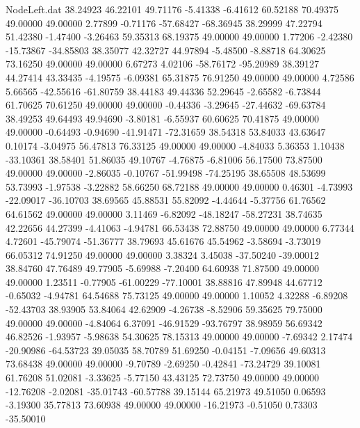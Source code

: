 \begin{filecontents}{NodeLeft.dat}
  38.24923   46.22101   49.71176    -5.41338   -6.41612   60.52188   70.49375   49.00000   49.00000    2.77899   -0.71176  -57.68427  -68.36945
  38.29999   47.22794   51.42380    -1.47400   -3.26463   59.35313   68.19375   49.00000   49.00000    1.77206   -2.42380  -15.73867  -34.85803
  38.35077   42.32727   44.97894    -5.48500   -8.88718   64.30625   73.16250   49.00000   49.00000    6.67273    4.02106  -58.76172  -95.20989
  38.39127   44.27414   43.33435    -4.19575   -6.09381   65.31875   76.91250   49.00000   49.00000    4.72586    5.66565  -42.55616  -61.80759
  38.44183   49.44336   52.29645    -2.65582   -6.73844   61.70625   70.61250   49.00000   49.00000   -0.44336   -3.29645  -27.44632  -69.63784
  38.49253   49.64493   49.94690    -3.80181   -6.55937   60.60625   70.41875   49.00000   49.00000   -0.64493   -0.94690  -41.91471  -72.31659
  38.54318   53.84033   43.63647     0.10174   -3.04975   56.47813   76.33125   49.00000   49.00000   -4.84033    5.36353    1.10438  -33.10361
  38.58401   51.86035   49.10767    -4.76875   -6.81006   56.17500   73.87500   49.00000   49.00000   -2.86035   -0.10767  -51.99498  -74.25195
  38.65508   48.53699   53.73993    -1.97538   -3.22882   58.66250   68.72188   49.00000   49.00000    0.46301   -4.73993  -22.09017  -36.10703
  38.69565   45.88531   55.82092    -4.44644   -5.37756   61.76562   64.61562   49.00000   49.00000    3.11469   -6.82092  -48.18247  -58.27231
  38.74635   42.22656   44.27399    -4.41063   -4.94781   66.53438   72.88750   49.00000   49.00000    6.77344    4.72601  -45.79074  -51.36777
  38.79693   45.61676   45.54962    -3.58694   -3.73019   66.05312   74.91250   49.00000   49.00000    3.38324    3.45038  -37.50240  -39.00012
  38.84760   47.76489   49.77905    -5.69988   -7.20400   64.60938   71.87500   49.00000   49.00000    1.23511   -0.77905  -61.00229  -77.10001
  38.88816   47.89948   44.67712    -0.65032   -4.94781   64.54688   75.73125   49.00000   49.00000    1.10052    4.32288   -6.89208  -52.43703
  38.93905   53.84064   42.62909    -4.26738   -8.52906   59.35625   79.75000   49.00000   49.00000   -4.84064    6.37091  -46.91529  -93.76797
  38.98959   56.69342   46.82526    -1.93957   -5.98638   54.30625   78.15313   49.00000   49.00000   -7.69342    2.17474  -20.90986  -64.53723
  39.05035   58.70789   51.69250    -0.04151   -7.09656   49.60313   73.68438   49.00000   49.00000   -9.70789   -2.69250   -0.42841  -73.24729
  39.10081   61.76208   51.02081    -3.33625   -5.77150   43.43125   72.73750   49.00000   49.00000  -12.76208   -2.02081  -35.01743  -60.57788
  39.15144   65.21973   49.51050     0.06593   -3.19300   35.77813   73.60938   49.00000   49.00000  -16.21973   -0.51050    0.73303  -35.50010

\end{filecontents}
